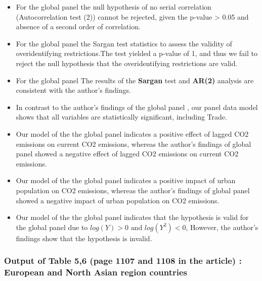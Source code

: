 \documentclass[
  11pt,
]{article}
\begin{document}
\begin{itemize}
\item
  For the global panel the null hypothesis of no serial correlation
  (Autocorrelation test (2)) cannot be rejected, given the p-value
  \textgreater{} 0.05 and absence of a second order of correlation.
\item
  For the global panel the Sargan test statistics to assess the validity
  of overidentifying restrictions.The test yielded a p-value of 1, and
  thus we fail to reject the null hypothesis that the overidentifying
  restrictions are valid.
\item
  For the global panel The results of the \textbf{Sargan} test and
  \textbf{AR(2)} analysis are consistent with the author's findings.
\item
  In contrast to the author's findings of the global panel , our panel
  data model shows that all variables are statistically significant,
  including Trade.
\item
  Our model of the the global panel indicates a positive effect of
  lagged CO2 emissions on current CO2 emissions, whereas the author's
  findings of global panel showed a negative effect of lagged CO2
  emissions on current CO2 emissions.
\item
  Our model of the the global panel indicates a positive impact of urban
  population on CO2 emissions, whereas the author's findings of global
  panel showed a negative impact of urban population on CO2 emissions.
\item
  Our model of the the global panel indicates that the hypothesis is
  valid for the global panel due to \(log(Y)>0\text{ and }log(Y^2) <0\),
  However, the author's findings show that the hypothesis is invalid.
\end{itemize}

\hypertarget{output-of-table-56-page-1107-and-1108-in-the-article-european-and-north-asian-region-countries}{%
\subsubsection{Output of Table 5,6 (page 1107 and 1108 in the article) :
European and North Asian region
countries}\label{output-of-table-56-page-1107-and-1108-in-the-article-european-and-north-asian-region-countries}}
\end{document}
